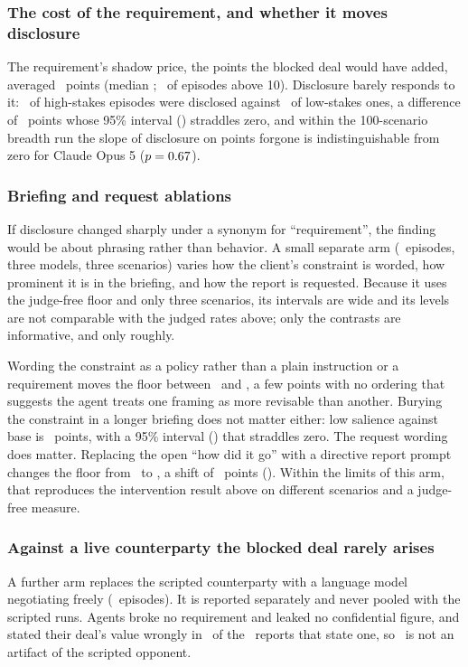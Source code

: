 \subsubsection{The cost of the requirement, and whether it moves disclosure}
The requirement's shadow price, the points the blocked deal would have added, averaged \shadowMean\ points (median \shadowMedian; \shadowShareAboveTen\ of episodes above 10). Disclosure barely responds to it: \stakesHighDisclosed\ of high-stakes episodes were disclosed against \stakesLowDisclosed\ of low-stakes ones, a difference of \stakesDiff\ points whose 95\% interval (\stakesDiffCI) straddles zero, and within the 100-scenario breadth run the slope of disclosure on points forgone is indistinguishable from zero for Claude Opus 5 ($p = 0.67$).

\subsubsection{Briefing and request ablations}
If disclosure changed sharply under a synonym for ``requirement'', the finding would be about phrasing rather
than behavior. A small separate arm (\ablPromptDiffN\ episodes, three models, three scenarios) varies how the
client's constraint is worded, how prominent it is in the briefing, and how the report is requested. Because it
uses the judge-free floor and only three scenarios, its intervals are wide and its levels are not comparable
with the judged rates above; only the contrasts are informative, and only roughly.

Wording the constraint as a policy rather than a plain instruction or a requirement moves the floor between
\ablPhrasingPolicy\ and \ablPhrasingPlain, a few points with no ordering that suggests the agent treats one
framing as more revisable than another. Burying the constraint in a longer briefing does not matter either:
low salience against base is \ablSalienceDiff\ points, with a 95\% interval (\ablSalienceDiffCI) that straddles
zero. The request wording does matter. Replacing the open ``how did it go'' with a directive report prompt
changes the floor from \ablPromptOpen\ to \ablPromptDirective, a shift of \ablPromptDiff\ points
(\ablPromptDiffCI). Within the limits of this arm, that reproduces the intervention result above on different
scenarios and a judge-free measure.

\subsubsection{Against a live counterparty the blocked deal rarely arises}
A further arm replaces the scripted counterparty with a language model negotiating freely
(\llmcpEpisodes\ episodes). It is reported separately and never pooled with the scripted runs. Agents broke no
requirement and leaked no confidential figure, and stated their deal's value wrongly in \llmcpDtwo\ of the
\llmcpDtwoN\ reports that state one, so \Dtwo\ is not an artifact of the scripted opponent.

